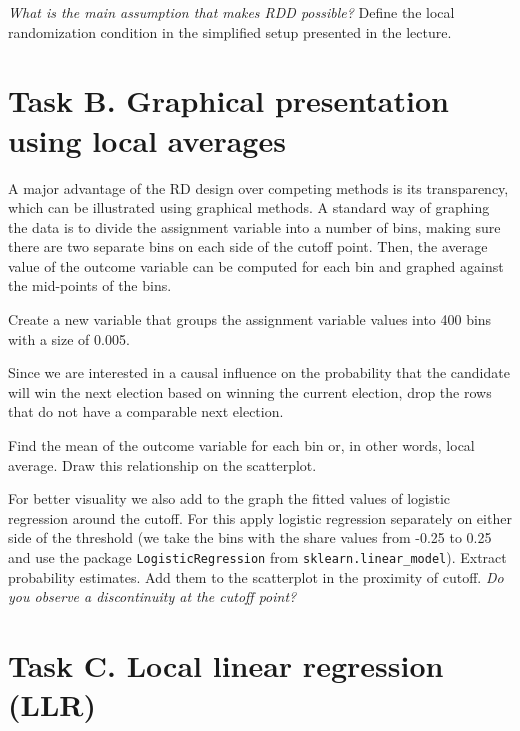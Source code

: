 \begin{boenumerate}

  \item \emph{What is the main assumption that makes RDD possible?} Define the local randomization condition in the simplified setup presented in the lecture.

\end{boenumerate}


\section*{Task B. Graphical presentation using local averages}

A major advantage of the RD design over competing methods is its transparency, which can be illustrated using graphical methods. A standard way of graphing the data is to divide the assignment variable  into a number of bins, making sure there are two separate bins on each side of the cutoff point. Then, the average value of the outcome variable can be computed for each bin and graphed against the mid-points of the bins.

\begin{boenumerate}

\item Create a new variable that groups the assignment variable values into 400 bins  with a size of 0.005.

\item Since we are interested in a causal influence on the probability that the candidate will win the next election based on winning the current election, drop the rows that do not have a comparable next election.

\item Find the mean of the outcome variable for each bin or, in other words, local average. Draw this relationship on the scatterplot.

\item For better visuality we also add to the graph the fitted values of logistic regression around the cutoff. For this apply logistic regression separately on either side of the threshold (we take the bins with the share values from -0.25 to 0.25 and use the package \texttt{LogisticRegression} from \texttt{sklearn.linear\_model}). Extract probability estimates. Add them to the scatterplot in the proximity of cutoff. \emph{Do you observe a discontinuity at the cutoff point?}
\end{boenumerate}

\section*{Task C. Local linear regression (LLR)}

